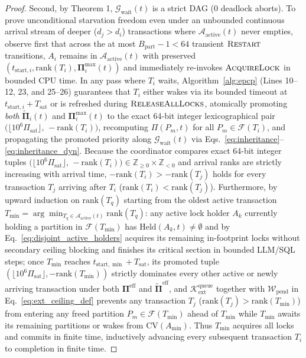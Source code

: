 \documentclass[conference,10pt]{IEEEtran}
\begin{document}
\begin{proof}
Second, by Theorem 1, $\mathcal{G}_{\text{wait}}(t)$ is a strict DAG ($0$ deadlock aborts). To prove unconditional starvation freedom even under an unbounded continuous arrival stream of deeper ($d_j > d_i$) transactions where $\mathcal{A}_{\text{active}}(t)$ never empties, observe first that across the at most $B_{\text{part}} - 1 < 64$ transient $\textsc{Restart}$ transitions, $A_i$ remains in $\mathcal{A}_{\text{active}}(t)$ with preserved $(t_{\text{start},i}, \text{rank}(T_i), \mathbf{\Pi}_i^{\max}(t))$ and immediately re-invokes $\textsc{AcquireLock}$ in bounded CPU time. In any pass where $T_i$ waits, Algorithm~\ref{alg:epcp} (Lines 10--12, 23, and 25--26) guarantees that $T_i$ either wakes via its bounded timeout at $t_{\text{start},i} + T_{\text{sat}}$ or is refreshed during $\textsc{ReleaseAllLocks}$, atomically promoting \textit{both} $\tilde{\mathbf{\Pi}}_i(t)$ and $\mathbf{\Pi}_i^{\max}(t)$ to the exact 64-bit integer lexicographical pair $\big(\lfloor 10^6 \Pi_{\text{sat}} \rfloor,\, -\text{rank}(T_i)\big)$, recomputing $\Pi(P_m, t)$ for all $P_m \in \mathcal{F}(T_i)$, and propagating the promoted priority along $\mathcal{G}_{\text{wait}}(t)$ via Eqs.~\eqref{eq:inheritance}--\eqref{eq:inheritance_dyn}. Because the coordinator compares exact 64-bit integer tuples $\big(\lfloor 10^6 \Pi_{\text{sat}} \rfloor,\, -\text{rank}(T_i)\big) \in \mathbb{Z}_{\ge 0} \times \mathbb{Z}_{< 0}$ and arrival ranks are strictly increasing with arrival time, $-\text{rank}(T_i) > -\text{rank}(T_j)$ holds for every transaction $T_j$ arriving after $T_i$ ($\text{rank}(T_i) < \text{rank}(T_j)$). Furthermore, by upward induction on $\text{rank}(T_q)$ starting from the oldest active transaction $T_{\min} = \arg\min_{T_q \in \mathcal{A}_{\text{active}}(t)} \text{rank}(T_q)$: any active lock holder $A_k$ currently holding a partition in $\mathcal{F}(T_{\min})$ has $\text{Held}(A_k, t) \ne \emptyset$ and by Eq.~\eqref{eq:disjoint_active_holders} acquires its remaining in-footprint locks without secondary ceiling blocking and finishes its critical section in bounded LLM/SQL steps; once $T_{\min}$ reaches $t_{\text{start},\min} + T_{\text{sat}}$, its promoted tuple $(\lfloor 10^6 \Pi_{\text{sat}} \rfloor, -\text{rank}(T_{\min}))$ strictly dominates every other active or newly arriving transaction under both $\mathbf{\Pi}^{\text{eff}}$ and $\tilde{\mathbf{\Pi}}^{\text{eff}}$, and $\mathcal{K}_{\text{ext}}^{\text{queue}}$ together with $\mathcal{W}_{\text{pend}}$ in Eq.~\eqref{eq:ext_ceiling_def} prevents any transaction $T_j$ ($\text{rank}(T_j) > \text{rank}(T_{\min})$) from entering any freed partition $P_m \in \mathcal{F}(T_{\min})$ ahead of $T_{\min}$ while $T_{\min}$ awaits its remaining partitions or wakes from $\text{CV}(A_{\min})$. Thus $T_{\min}$ acquires all locks and commits in finite time, inductively advancing every subsequent transaction $T_i$ to completion in finite time.
\end{proof}
\end{document}
